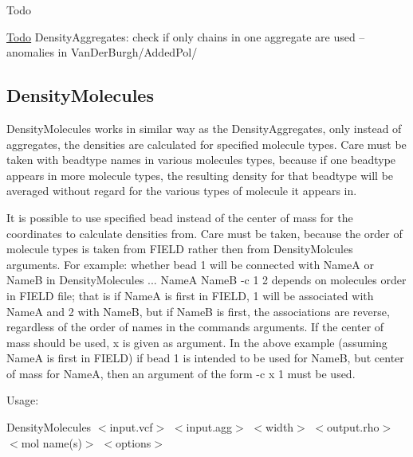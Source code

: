 \begin{DoxyRefDesc}{Todo}
\item[\hyperlink{todo__todo000002}{Todo}]Density\+Aggregates\+: check if only chains in one aggregate are used -- anomalies in Van\+Der\+Burgh/\+Added\+Pol/\end{DoxyRefDesc}
\hypertarget{Common_DensityMolecules}{}\subsection{Density\+Molecules}\label{Common_DensityMolecules}
Density\+Molecules works in similar way as the Density\+Aggregates, only instead of aggregates, the densities are calculated for specified molecule types. Care must be taken with beadtype names in various molecules types, because if one beadtype appears in more molecule types, the resulting density for that beadtype will be averaged without regard for the various types of molecule it appears in.

It is possible to use specified bead instead of the center of mass for the coordinates to calculate densities from. Care must be taken, because the order of molecule types is taken from {\ttfamily F\+I\+E\+LD} rather then from {\ttfamily Density\+Molcules} arguments. For example\+: whether bead 1 will be connected with {\ttfamily NameA} or {\ttfamily NameB} in {\ttfamily Density\+Molecules ... NameA NameB -\/c 1 2} depends on molecules\textquotesingle{} order in {\ttfamily F\+I\+E\+LD} file; that is if {\ttfamily NameA} is first in {\ttfamily F\+I\+E\+LD}, 1 will be associated with {\ttfamily NameA} and 2 with {\ttfamily NameB}, but if {\ttfamily NameB} is first, the associations are reverse, regardless of the order of names in the command\textquotesingle{}s arguments. If the center of mass should be used, {\ttfamily x} is given as argument. In the above example (assuming {\ttfamily NameA} is first in {\ttfamily F\+I\+E\+LD}) if bead 1 is intended to be used for {\ttfamily NameB}, but center of mass for {\ttfamily NameA}, then an argument of the form {\ttfamily -\/c x 1} must be used.

Usage\+:

{\ttfamily Density\+Molecules $<$input.\+vcf$>$ $<$input.\+agg$>$ $<$width$>$ $<$output.\+rho$>$ $<$mol name(s)$>$ $<$options$>$}

